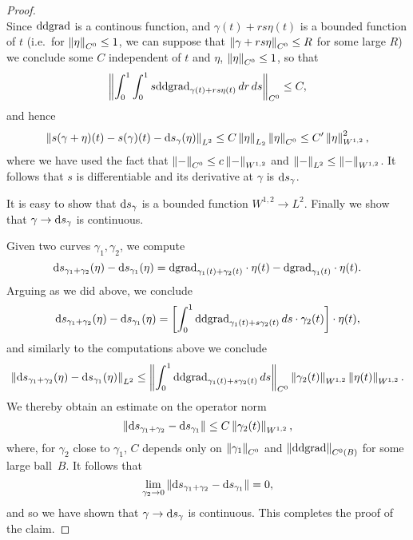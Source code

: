 \documentclass{amsart}
\begin{document}
\begin{proof}
\begin{equation*}
  \end{equation*}
  Since $\mathrm{d}\mathrm{d}\mathrm{grad}$ is a continous function, and $\gamma(t)+rs\eta(t)$ is a bounded function of $t$ (i.e.\ for $\left\lVert\eta\right\rVert_{C^{0}}\le 1$, we can suppose that $\left\lVert\gamma+rs\eta\right\rVert_{C^{0}}\le R$ for some large $R$) we conclude some $C$ independent of $t$ and $\eta$, $\left\lVert\eta\right\rVert_{C^{0}}\le 1$, so that
  \begin{equation*} \left\lVert\int_{0}^{1}\int_{0}^{1}s\mathrm{d}\mathrm{d}\mathrm{grad}_{\gamma(t)+rs\eta(t)}\,dr\,ds\right\rVert_{C^{0}}\le C,
  \end{equation*}
  and hence
  \begin{equation*}
    \left\lVert s(\gamma+\eta)(t)-s(\gamma)(t)-\mathrm{d} s_{\gamma}(\eta)\right\rVert_{L^{2}}\le C\left\lVert\eta\right\rVert_{L_{2}}\left\lVert\eta\right\rVert_{C^{0}}\le C'\left\lVert\eta\right\rVert_{W^{1,2}}^{2},
  \end{equation*}
  where we have used the fact that $\left\lVert-\right\rVert_{C^{0}}\le c\left\lVert-\right\rVert_{W^{1,2}}$ and $\left\lVert-\right\rVert_{L^{2}}\le \left\lVert-\right\rVert_{W^{1,2}}$. It follows that $s$ is differentiable and its derivative at $\gamma$ is $\mathrm{d} s_{\gamma}$.

  It is easy to show that $\mathrm{d} s_{\gamma}$ is a bounded function $W^{1,2}\to L^{2}$. Finally we show that $\gamma\to \mathrm{d} s_{\gamma}$ is continuous.

  Given two curves $\gamma_{1},\gamma_{2}$, we compute
  \begin{equation*}
    \mathrm{d} s_{\gamma_{1}+\gamma_{2}}(\eta)-\mathrm{d} s_{\gamma_{1}}(\eta)=\mathrm{d} \mathrm{grad}_{\gamma_{1}(t)+\gamma_{2}(t)}\cdot \eta(t)-\mathrm{d}\mathrm{grad}_{\gamma_{1}(t)}\cdot \eta(t).
  \end{equation*}
  Arguing as we did above, we conclude
  \begin{equation*}
    \mathrm{d} s_{\gamma_{1}+\gamma_{2}} (\eta)-\mathrm{d} s_{\gamma_{1}}(\eta)=\left[\int_{0}^{1}\mathrm{d}\mathrm{d}\mathrm{grad}_{\gamma_{1}(t)+s\gamma_{2}(t)}\,ds\cdot \gamma_{2}(t)\right]\cdot \eta(t),
  \end{equation*}
  and similarly to the computations above we conclude
  \begin{equation*}
    \left\lVert\mathrm{d} s_{\gamma_{1}+\gamma_{2}}(\eta)-\mathrm{d} s_{\gamma_{1}}(\eta)\right\rVert_{L^{2}}\le \left\lVert\int_{0}^{1}\mathrm{d}\mathrm{d}\mathrm{grad}_{\gamma_{1}(t)+s\gamma_{2}(t)}\,ds\right\rVert_{C^{0}}\left\lVert\gamma_{2}(t)\right\rVert_{W^{1,2}}\left\lVert\eta(t)\right\rVert_{W^{1,2}}.
  \end{equation*}
  We thereby obtain an estimate on the operator norm
  \begin{equation*}
    \left\lVert\mathrm{d} s_{\gamma_{1}+\gamma_{2}}-\mathrm{d} s_{\gamma_{1}}\right\rVert\le C\left\lVert\gamma_{2}(t)\right\rVert_{W^{1,2}},
  \end{equation*}
  where, for $\gamma_{2}$ close to $\gamma_{1}$, $C$ depends only on $\left\lVert\gamma_{1}\right\rVert_{C^{0}}$ and $\left\lVert\mathrm{d}\mathrm{d}\mathrm{grad}\right\rVert_{C^{0}(B)}$ for some large ball~$B$. It follows that
  \begin{equation*}
    \lim_{\gamma_{2}\to 0}\left\lVert\mathrm{d} s_{\gamma_{1}+\gamma_{2}}-\mathrm{d} s_{\gamma_{1}}\right\rVert=0,
  \end{equation*}
  and so we have shown that $\gamma\to \mathrm{d} s_{\gamma}$ is continuous. This completes the proof of the claim. 
\end{proof}
\end{document}
